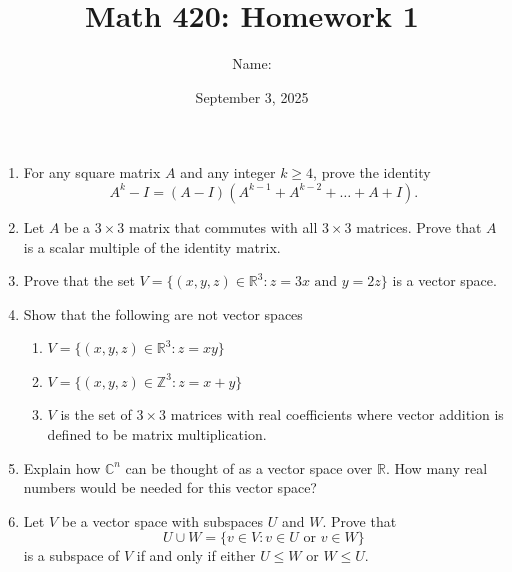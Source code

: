\documentclass[12pt]{article}
\title{\vspace{-2.5cm}Math 420: Homework 1}
\author{Name:}
\date{September 3, 2025}
\begin{document}
\maketitle

\begin{enumerate}
    \item For any square matrix $A$ and any integer $k \geq 4$, prove the identity 
    \[
    A^k - I = (A-I)(A^{k-1} + A^{k-2} + \dots + A + I).
    \]

    \vspace{5cm}

    \item Let $A$ be a $3\times 3$ matrix that commutes with all $3\times 3$ matrices. Prove that $A$ is a scalar multiple of the identity matrix.

    \newpage

    \item Prove that the set $V = \{(x,y,z) \in \mathbb{R}^3 : z = 3x \text{ and } y=2z\}$ is a vector space. 

    \vspace{7cm}

    \item Show that the following are not vector spaces 
    \begin{enumerate}
        \item $V = \{(x,y,z) \in \mathbb{R}^3 : z = xy\}$

        \vspace{3cm}
    
        \item $V = \{(x,y,z) \in \mathbb{Z}^3 : z = x+y\}$

        \vspace{3cm}

        \item $V$ is the set of $3 \times 3$ matrices with real coefficients where vector addition is defined to be matrix multiplication.
    \end{enumerate}

    \newpage

    \item Explain how $\mathbb{C}^n$ can be thought of as a vector space over $\mathbb{R}$. How many real numbers would be needed for this vector space?

    \vspace{6cm}

    \item Let $V$ be a vector space with subspaces $U$ and $W$. Prove that 
    \[
        U \cup W = \{v \in V : v \in U \text{ or } v \in W\}
    \]
    is a subspace of $V$ if and only if either $U \leq W$ or $W \leq U$.
\end{enumerate}
\end{document}
